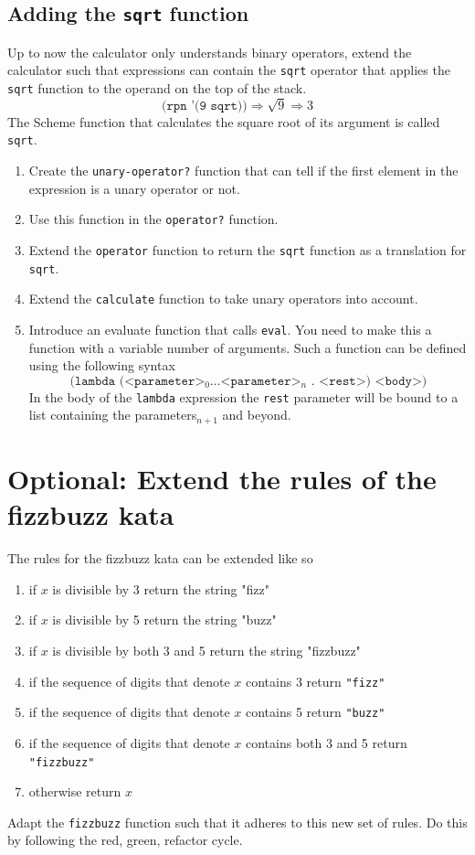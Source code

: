 \documentclass[12pt,a4paper,english,twoside]{article}
\begin{document}
\subsection{Adding the \texttt{sqrt} function}
Up to now the calculator only understands binary operators, extend the 
calculator such that expressions can contain the \texttt{sqrt} operator that 
applies the \texttt{sqrt} function to the operand on the top of the stack.  
\begin{equation*}
  \texttt{(rpn '(9 sqrt))} \Rightarrow \sqrt{9} \Rightarrow 3
\end{equation*}
The Scheme function that calculates the square root of its argument is called 
\texttt{sqrt}.
\begin{enumerate}
  \item Create the \texttt{unary-operator?} function that can tell if the 
    first element in the expression is a unary operator or not. 
  \item Use this function in the \texttt{operator?} function.
  \item Extend the \texttt{operator} function to return the \texttt{sqrt} function as a 
    translation for \texttt{sqrt}.
  \item Extend the \texttt{calculate} function to take unary operators into 
    account.
  \item Introduce an evaluate function that calls \texttt{eval}. You need to 
    make this a function with a variable number of arguments. Such a function 
    can be defined using the following syntax
    \begin{equation*}
      \texttt{(lambda (<parameter>$_{0} \dots $<parameter>$_{n}$ . <rest>) <body>)}
    \end{equation*}
    In the body of the \texttt{lambda} expression the \texttt{rest} parameter 
    will be bound to a list containing the parameters$_{n+1}$ and beyond.
\end{enumerate}
\section{Optional: Extend the rules of the fizzbuzz kata}
The rules for the fizzbuzz kata can be extended like so
\begin{enumerate}
  \item if $x$ is divisible by 3 return the string "fizz"
  \item if $x$ is divisible by 5 return the string "buzz"
  \item if $x$ is divisible by both 3 and 5 return the string "fizzbuzz"
  \item if the sequence of digits that denote $x$ contains 3 return \texttt{"fizz"} 
  \item if the sequence of digits that denote $x$ contains 5 return \texttt{"buzz"} 
  \item if the sequence of digits that denote $x$ contains both 3 and 5 return \texttt{"fizzbuzz"} 
  \item otherwise return $x$
\end{enumerate}
Adapt the \texttt{fizzbuzz} function such that it adheres to this new set of 
rules. Do this by following the red, green, refactor cycle.

\end{document}
